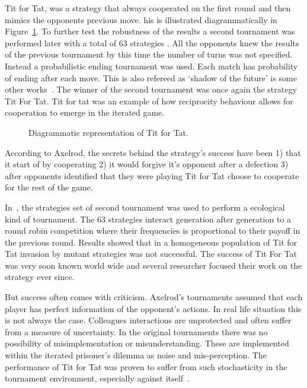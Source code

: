 \documentclass{article}
\begin{document}
Tit for Tat, was a strategy that always cooperated on the first round and then
mimics the opponents previous move. his is illustrated diagrammatically in 
Figure~\ref{fig:tit_for_tat_diagram}. To further test the robustness of the 
results a second tournament was performed later with a total of 63 strategies
\cite{axelrod1980b}. All the opponents knew the results of the previous 
tournament by this time the number of turns was not specified. Instead
a probabilistic ending tournament was used. Each match has probability of 
ending after each move. This is also refereed as `shadow of the future'
is some other works~\cite{axelrod1988}. The winner of the second tournament
was once again the strategy Tit For Tat. Tit for tat was an example of how reciprocity
behaviour allows for cooperation to emerge in the iterated game.

\begin{figure}[!hbtp]
    \centering
    
    \caption{Diagrammatic representation of Tit for Tat.}
    \label{fig:tit_for_tat_diagram}
\end{figure}

According to Axelrod, the secrets behind the strategy's success have been
1) that it start of by cooperating 2) it would forgive it's opponent after a
defection 3) after opponents identified that they were playing Tit for Tat choose 
to cooperate for the rest of the game. 

In~\cite{Axelrod1981}, the strategies set of second tournament was used
to perform a ecological kind of tournament. The 63 strategies interact generation
after generation to a round robin competition where their frequencies is proportional
to their payoff in the previous round. Results showed that in a homogeneous
population of Tit for Tat invasion by mutant strategies was not successful. 
The success of Tit For Tat was very soon  known world wide and several researcher
focused their work on the strategy ever since.%

But success often comes with criticism. Axelrod's tournaments assumed that
each player has perfect information of the opponent's actions. In real life 
situation this is not always the case. Colleagues interactions are unprotected
and often suffer from a measure of uncertainty. In the original tournaments
there was no possibility of misimplementation or misunderstanding. These
are implemented within the iterated prisoner's dilemma as noise and 
mis-perception. The performance of Tit for Tat was proven to suffer from
such stochasticity in the tournament environment, especially against
itself~\cite{Bendor1991,Godfray1992, Molander1985, Nowak1992}.
\end{document}
